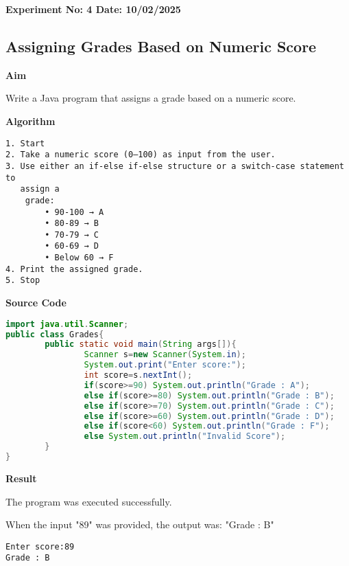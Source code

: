 \textbf{Experiment No: 4 \hfill Date: 10/02/2025}

\begin{center}
    \Large \subsection*{Assigning Grades Based on Numeric Score}
\end{center}

\textbf{Aim}
\vspace{0.5cm}

Write a Java program that assigns a grade based on a numeric score.

\vspace{0.5cm}
\textbf{Algorithm}
\vspace{0.5cm}
\begin{verbatim}
1. Start
2. Take a numeric score (0–100) as input from the user.
3. Use either an if-else if-else structure or a switch-case statement to 
   assign a
    grade:
        • 90-100 → A
        • 80-89 → B
        • 70-79 → C
        • 60-69 → D
        • Below 60 → F
4. Print the assigned grade.
5. Stop
\end{verbatim}

\vspace{0.5cm}
\textbf{Source Code}
\begin{lstlisting}[language=Java]
import java.util.Scanner;
public class Grades{
        public static void main(String args[]){
                Scanner s=new Scanner(System.in);
                System.out.print("Enter score:");
                int score=s.nextInt();
                if(score>=90) System.out.println("Grade : A");
                else if(score>=80) System.out.println("Grade : B");
                else if(score>=70) System.out.println("Grade : C");
                else if(score>=60) System.out.println("Grade : D");
                else if(score<60) System.out.println("Grade : F");
                else System.out.println("Invalid Score");
        }
}
\end{lstlisting}

\vspace{0.5cm}
\textbf{Result}
\vspace{0.5cm}

The program was executed successfully. 

When the input "89" was provided, the output was: "Grade : B"
\begin{verbatim}
Enter score:89 
Grade : B
\end{verbatim}

